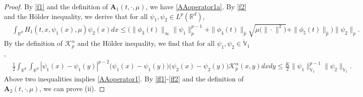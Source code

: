 \documentclass[11pt]{article}
\renewcommand{\leq}{\leqslant}
\numberwithin{equation}{section}
\begin{document}
\begin{proof}
By \eqref{f1} and the definition of $\mathbf{A}_1(t,\cdot,\mu)$, we have \eqref{AAoperator1a}.
By \eqref{f2} and the H\"{o}lder
inequality, we derive that for all $\psi_1,\psi_2\in L^{p}
(\mathbb{R}^d)$,
\begin{align*}&
\int_{\mathbb{R}^d}
H_1(t,x,\psi_1(x),\mu)\psi_2(x)dx\leq \Big(\|\phi_3(t)
\|_{\infty}
\|\psi_1\|^{p-1}_p
+\|\phi_4(t)
\|_{\widehat{p}}
\sqrt{\mu\big(\|\cdot\|^2\big)}
+
\|\phi_5(t)
\|_{\widehat{p}}\Big)
\|\psi_2\|_p.
  \end{align*}
By the definition of $\mathcal{K}^\alpha_{p}$ and the H\"{o}lder
inequality, we find that for all $\psi_1,\psi_2\in \dot{\mathbb{V}}_1$,
 \begin{align*}&
\frac{1}{2}\int_{\mathbb{R}^d}  \int_{\mathbb{R}^d}|\psi_1(x)
-\psi_1(y)|^{p-2}\big
(\psi_1(x)-\psi_1(y)\big)
 \big( \psi_2(x)-\psi_2(y)\big)
 \mathcal{K}_{p}^\alpha(x,y)dxdy
 \leq \frac{K}{2}\| \psi_1  \|_{\dot{\mathbb{V}}_1}^{p-1}\| \psi_2\|_{\dot{\mathbb{V}}_1}.
 \end{align*}
Above two inequalities implies  \eqref{AAoperator1}. By
\eqref{ff1}-\eqref{ff2} and the definition of $\mathbf{A}_2(t,\cdot,\mu)$, we can prove (ii).
\end{proof}
\end{document}
